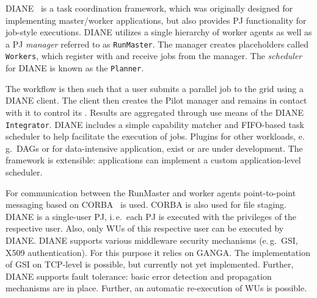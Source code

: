 \documentclass{sig-alternate}
\begin{document}
DIANE~\cite{Moscicki:908910} is a task coordination framework, which
was originally designed for implementing master/worker applications,
but also provides PJ functionality for job-style executions.
DIANE utilizes a single hierarchy of worker agents as well as a PJ \textit{manager}
referred to as \texttt{RunMaster}.  The manager creates
placeholders called \texttt{Workers}, which register with and receive jobs from the manager.
The \textit{scheduler} for DIANE is known as the \texttt{Planner}.


The workflow is then such that a user submits a parallel job to
the grid using a DIANE client.  The client then creates the Pilot manager
and remains in contact with it to control its \pilotjobs.  Results
are aggregated through use means of the DIANE
\texttt{Integrator}.
DIANE includes a simple capability matcher and FIFO-based task scheduler
to help facilitate the execution of jobs.
Plugins for other workloads, e.\,g.\ DAGs or for data-intensive
application, exist or are under development. The framework is extensible:
applications can implement a custom application-level scheduler.

For communication between the RunMaster and
worker agents point-to-point messaging based on CORBA~\cite{OMG-CORBA303:2004}
is used. CORBA is also used for file staging.
DIANE is a single-user PJ, i.\,e.\ each PJ is executed with the
privileges of the respective user. Also, only WUs of this respective user can be
executed by DIANE. DIANE supports various middleware security mechanisms
(e.\,g.\ GSI, X509 authentication). For this purpose it relies on GANGA. The
implementation of GSI on TCP-level is possible, but currently not yet
implemented. Further, DIANE supports fault tolerance: basic error detection and
propagation mechanisms are in place. Further, an automatic re-execution of WUs
is possible.
\end{document}
